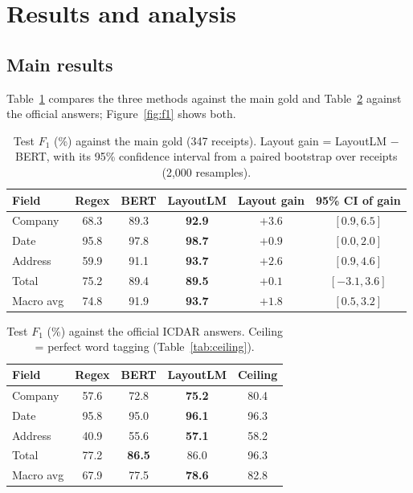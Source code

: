 
\section{Results and analysis}
\label{sec:results}

\subsection{Main results}

Table~\ref{tab:main} compares the three methods against the main gold
and Table~\ref{tab:official} against the official answers;
Figure~\ref{fig:f1} shows both.

\begin{table}[t]
  \centering
  \small
  \begin{tabular}{lccccc}
    \toprule
    Field     & Regex & BERT & LayoutLM & Layout gain & 95\% CI of gain \\
    \midrule
    Company   & 68.3 & 89.3 & \textbf{92.9} & $+3.6$ & $[0.9, 6.5]$ \\
    Date      & 95.8 & 97.8 & \textbf{98.7} & $+0.9$ & $[0.0, 2.0]$ \\
    Address   & 59.9 & 91.1 & \textbf{93.7} & $+2.6$ & $[0.9, 4.6]$ \\
    Total     & 75.2 & 89.4 & \textbf{89.5} & $+0.1$ & $[-3.1, 3.6]$ \\
    \midrule
    Macro avg & 74.8 & 91.9 & \textbf{93.7} & $+1.8$ & $[0.5, 3.2]$ \\
    \bottomrule
  \end{tabular}
  \caption{Test $F_1$ (\%) against the main gold (347 receipts). Layout
  gain = LayoutLM $-$ BERT, with its 95\% confidence interval from a
  paired bootstrap over receipts (2{,}000 resamples).}
  \label{tab:main}
\end{table}

\begin{table}[t]
  \centering
  \small
  \begin{tabular}{lcccc}
    \toprule
    Field     & Regex & BERT & LayoutLM & Ceiling \\
    \midrule
    Company   & 57.6 & 72.8 & \textbf{75.2} & 80.4 \\
    Date      & 95.8 & 95.0 & \textbf{96.1} & 96.3 \\
    Address   & 40.9 & 55.6 & \textbf{57.1} & 58.2 \\
    Total     & 77.2 & \textbf{86.5} & 86.0 & 96.3 \\
    \midrule
    Macro avg & 67.9 & 77.5 & \textbf{78.6} & 82.8 \\
    \bottomrule
  \end{tabular}
  \caption{Test $F_1$ (\%) against the official ICDAR answers. Ceiling =
  perfect word tagging (Table~\ref{tab:ceiling}).}
  \label{tab:official}
\end{table}

